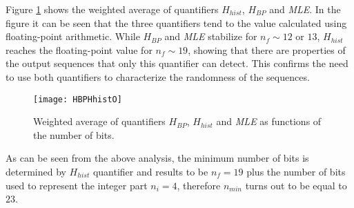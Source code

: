 Figure \ref{fig:HBPHhist} shows the weighted average of quantifiers $H_{hist}$, $H_{BP}$ and \textsl{MLE}. In the figure it can be seen that the three quantifiers tend to the value calculated using floating-point arithmetic. While $H_{BP}$ and \textsl{MLE} stabilize for $n_f \sim 12$ or $13$, $H_{hist}$ reaches the floating-point value for $n_f \sim 19$, showing that there are properties of the output sequences that only this quantifier can detect. This confirms the need to use both quantifiers to characterize the randomness of the sequences.

\begin{figure}
    \centering
        \texttt{[image: HBPHhistO]}\\
    \caption{Weighted average of quantifiers $H_{BP}$,  $H_{hist}$ and \textsl{MLE} as functions of the number of bits.}\label{fig:HBPHhist}
\end{figure}


As can be seen from the above analysis, the minimum number of bits is determined by $H_{hist}$ quantifier and results to be $n_f=19$ plus the number of bits used to represent the integer part $n_i=4$, therefore $n_{min}$ turns out to be equal to $23$.




% 
%
%
%
%
